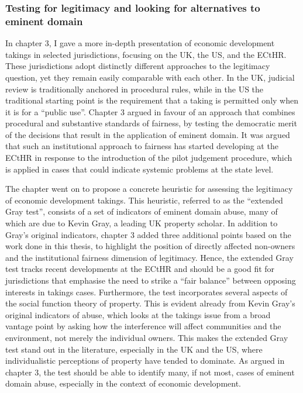 \subsubsection*{Testing for legitimacy and looking for alternatives to eminent domain}

In chapter 3, I gave a more in-depth presentation of economic development takings in selected jurisdictions, focusing on the UK, the US, and the ECtHR. These jurisdictions adopt distinctly different approaches to the legitimacy question, yet they remain easily comparable with each other. In the UK, judicial review is traditionally anchored in procedural rules, while in the US the traditional starting point is the requirement that a taking is permitted only when it is for a ``public use''. Chapter 3 argued in favour of an approach that combines procedural and substantive standards of fairness, by testing the democratic merit of the decisions that result in the application of eminent domain. It was argued that such an institutional approach to fairness has started developing at the ECtHR in response to the introduction of the pilot judgement procedure, which is applied in cases that could indicate systemic problems at the state level.

The chapter went on to propose a concrete heuristic for assessing the legitimacy of economic development takings. This heuristic, referred to as the ``extended Gray test'', consists of a set of indicators of eminent domain abuse, many of which are due to Kevin Gray, a leading UK property scholar. In addition to Gray's original indicators, chapter 3 added three additional points based on the work done in this thesis, to highlight the position of directly affected non-owners and the institutional fairness dimension of legitimacy. Hence, the extended Gray test tracks recent developments at the ECtHR and should be a good fit for jurisdictions that emphasise the need to strike a ``fair balance'' between opposing interests in takings cases. Furthermore, the test incorporates several aspects of the social function theory of property. This is evident already from Kevin Gray's original indicators of abuse, which looks at the takings issue from a broad vantage point by asking how the interference will affect communities and the environment, not merely the individual owners. This makes the extended Gray test stand out in the literature, especially in the UK and the US, where individualistic perceptions of property have tended to dominate. As argued in chapter 3, the test should be able to identify many, if not most, cases of eminent domain abuse, especially in the context of economic development.

